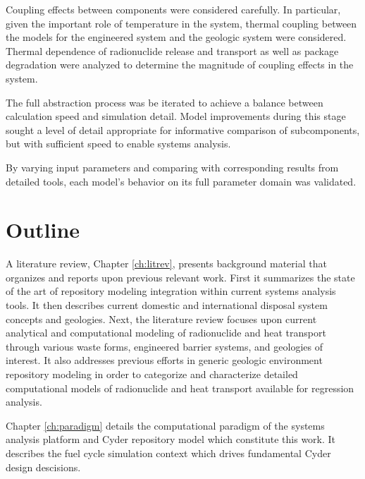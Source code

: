 
Coupling effects between components were considered carefully.  In 
particular, given the important role of temperature in the system, thermal 
coupling between the models for the engineered system and the geologic system 
were considered. Thermal dependence of radionuclide release and transport as 
well as package degradation were analyzed to determine the 
magnitude of coupling effects in the system.


The full abstraction process was be iterated to achieve a balance between 
calculation speed and simulation detail. Model improvements during this stage 
sought a level of detail appropriate for informative comparison of subcomponents, but 
with sufficient speed to enable systems analysis. 


By varying input parameters and comparing with corresponding results from 
detailed tools, each model's behavior on its full parameter domain was 
validated.


\section{Outline}


A literature review, Chapter \ref{ch:litrev}, presents background material that organizes and 
reports upon previous relevant work. First it summarizes the state of the art of 
repository modeling integration within current systems analysis tools. It then 
describes current domestic and international disposal system concepts and
geologies.  Next, the literature review focuses upon current analytical and 
computational modeling of radionuclide and heat transport through various waste 
forms, engineered barrier systems, and geologies of interest.  It also 
addresses previous efforts in generic geologic environment repository modeling in order to 
categorize and characterize detailed computational models of radionuclide and 
heat transport available for regression analysis.


Chapter \ref{ch:paradigm} details the computational paradigm of the \Cyclus 
systems analysis platform and Cyder repository model which constitute this work. 
It describes the \Cyclus fuel cycle simulation context which drives fundamental 
Cyder design descisions. 

